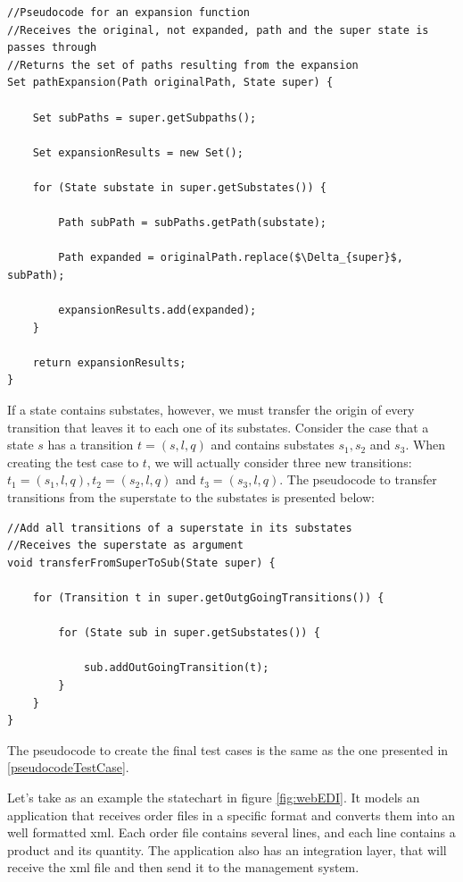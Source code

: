 \begin{lstlisting}[mathescape]
//Pseudocode for an expansion function
//Receives the original, not expanded, path and the super state is passes through
//Returns the set of paths resulting from the expansion
Set pathExpansion(Path originalPath, State super) {
		
	Set subPaths = super.getSubpaths();

	Set expansionResults = new Set();

	for (State substate in super.getSubstates()) {
		
		Path subPath = subPaths.getPath(substate);

		Path expanded = originalPath.replace($\Delta_{super}$, subPath);

		expansionResults.add(expanded);
	}

	return expansionResults;
}

\end{lstlisting}

If a state contains substates, however, we must transfer the origin of every transition that leaves it to each one of its substates. Consider the case that a state $s$ has a transition $t = (s,l,q)$ and contains substates $s_1, s_2$ and $s_3$. When creating the test case to $t$, we will actually consider three new transitions: $t_1 = (s_1,l,q), t_2 = (s_2,l,q)$ and $t_3 = (s_3,l,q)$. The pseudocode to transfer transitions from the superstate to the substates is presented below:

\begin{lstlisting}
//Add all transitions of a superstate in its substates
//Receives the superstate as argument
void transferFromSuperToSub(State super) {
	
	for (Transition t in super.getOutgGoingTransitions()) {
		
		for (State sub in super.getSubstates()) {
			
			sub.addOutGoingTransition(t);
		}
	}
}

\end{lstlisting}

The pseudocode to create the final test cases is the same as the one presented in \ref{pseudocodeTestCase}.

Let's take as an example the statechart in figure \ref{fig:webEDI}. It models an application that receives order files in a specific format and converts them into an well formatted xml. Each order file contains several lines, and each line contains a product and its quantity. The application also has an integration layer, that will receive the xml file and then send it to the management system.

